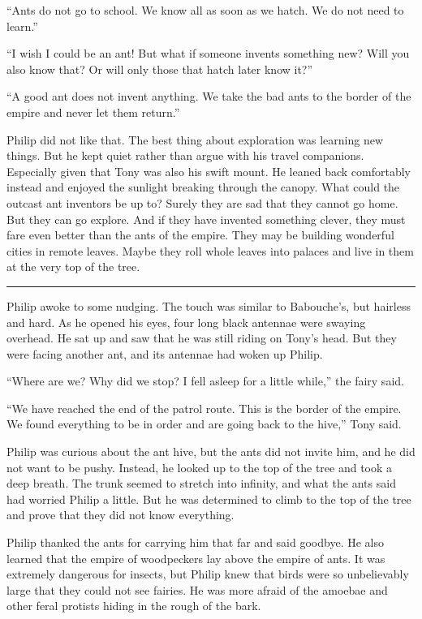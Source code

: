 \documentclass[10pt]{memoir}
\renewcommand{\pfbreakdisplay}{\bigskip \ding{166} \bigskip}
\newcommand{\secbreak}{\fancybreak{\pfbreakdisplay}}
\begin{document}
``Ants do not go to school. We know all as soon as we hatch. We do not need to
learn.''

``I wish I could be an ant! But what if someone invents something new? Will you
also know that? Or will only those that hatch later know it?''

``A good ant does not invent anything. We take the bad ants to the border of
the empire and never let them return.''

Philip did not like that. The best thing about exploration was learning new
things. But he kept quiet rather than argue with his travel companions.
Especially given that Tony was also his swift mount. He leaned back comfortably
instead and enjoyed the sunlight breaking through the canopy. What could the
outcast ant inventors be up to? Surely they are sad that they cannot go home.
But they can go explore. And if they have invented something clever, they must
fare even better than the ants of the empire. They may be building wonderful
cities in remote leaves. Maybe they roll whole leaves into palaces and live in
them at the very top of the tree.

\secbreak

Philip awoke to some nudging. The touch was similar to Babouche's, but hairless
and hard. As he opened his eyes, four long black antennae were swaying
overhead. He sat up and saw that he was still riding on Tony's head. But they
were facing another ant, and its antennae had woken up Philip.

``Where are we? Why did we stop? I fell asleep for a little while,'' the fairy
said.

``We have reached the end of the patrol route. This is the border of the
empire. We found everything to be in order and are going back to the hive,''
Tony said.

Philip was curious about the ant hive, but the ants did not invite him, and he
did not want to be pushy. Instead, he looked up to the top of the tree and took
a deep breath. The trunk seemed to stretch into infinity, and what the ants
said had worried Philip a little. But he was determined to climb to the top of
the tree and prove that they did not know everything.

Philip thanked the ants for carrying him that far and said goodbye. He also
learned that the empire of woodpeckers lay above the empire of ants. It was
extremely dangerous for insects, but Philip knew that birds were so
unbelievably large that they could not see fairies. He was more afraid of the
amoebae and other feral protists hiding in the rough of the bark.
\end{document}
